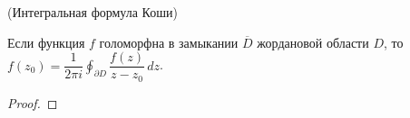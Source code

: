 \begin{comment}
	$\lim\limits_{\epsilon \to 0} \iint_{D_{\epsilon}} \dfrac{\partial f}{\partial \overline{z}} \cdot \dfrac{dx \wedge dy}{z - z_0}$ называется  \textit{главным значением} несобственного интеграла.
\end{comment}

\begin{corollary} (Интегральная формула Коши)
	
	Если функция $f$ голоморфна в замыкании $\overline{D}$ жордановой области $D$, то $f(z_0) = \dfrac{1}{2\pi i} \oint_{\partial D} \dfrac{f(z)}{z - z_0}\, dz$.
\end{corollary}
	
	\begin{proof}
		
	\end{proof}